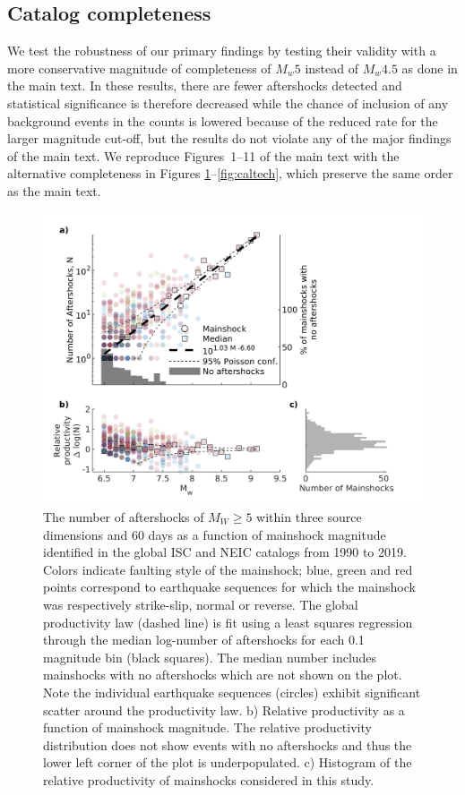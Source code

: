 \documentclass[draft]{agujournal}
\begin{document}
\subsection{Catalog completeness}\label{sec:catalog}
We test the robustness of our primary findings by testing their validity with a more conservative magnitude of completeness of $M_w5$ instead of $M_w4.5$ as done in the main text. In these results, there are fewer aftershocks detected and statistical significance is therefore decreased while the chance of  inclusion of any background events in the counts is lowered because of the reduced rate for the larger magnitude cut-off, but the results do not violate any of the major findings of the main text.  We reproduce Figures~1--11 of the main text with the alternative completeness in Figures \ref{fig:fms_prod}--\ref{fig:caltech}, which preserve the same order as the main text. 

\begin{figure}[H]
\centering
\includegraphics{figures/prod_law_mw5.png}
\caption{The number of aftershocks of $M_W\ge5$ within three source dimensions and 60 days as a function of mainshock magnitude identified in the global ISC and NEIC catalogs from 1990 to 2019. Colors indicate faulting style of the mainshock; blue, green and red points correspond to earthquake sequences for which the mainshock was respectively strike-slip, normal or reverse. The global productivity law (dashed line) is fit using a least squares regression through the median log-number of aftershocks for each 0.1 magnitude bin (black squares). The median number includes mainshocks with no aftershocks which are not shown on the plot. Note the individual earthquake sequences (circles) exhibit significant scatter around the productivity law. b) Relative productivity as a function of mainshock magnitude. The relative productivity distribution does not show events with no aftershocks and thus the lower left corner of the plot is underpopulated. c) Histogram of the relative productivity of mainshocks considered in this study.
}
\label{fig:fms_prod}
\end{figure}
\end{document}
